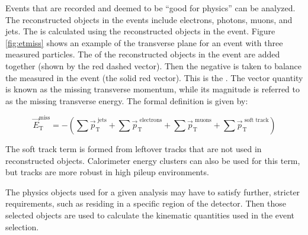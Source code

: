 Events that are recorded and deemed to be ``good for physics'' can be analyzed. The reconstructed objects in the events include electrons, photons, muons, and jets. The \etmiss is calculated using the reconstructed objects in the event. Figure \ref{fig:etmiss} shows an example of the transverse plane for an event with three measured particles. The \pt of the reconstructed objects in the event are added together (shown by the red dashed vector). Then the negative is taken to balance the measured \pt in the event (the solid red vector). This is the \etmissvec. The vector quantity \etmissvec is known as the missing transverse momentum, while its magnitude \etmiss is referred to as the missing transverse energy. The formal definition is given by:

\begin{equation}
\vec{E}_\text{T}^\text{miss} = - \left( \sum \vec{p}_\text{T}^\text{ jets} + \sum \vec{p}_\text{T}^\text{ electrons} + \sum \vec{p}_\text{T}^\text{ muons} + \sum \vec{p}_\text{T}^\text{ soft track} \right)
\end{equation}

\noindent The soft track term is formed from leftover tracks that are not used in reconstructed objects. Calorimeter energy clusters can also be used for this term, but tracks are more robust in high pileup environments. 

The physics objects used for a given analysis may have to satisfy further, stricter requirements, such as residing in a specific region of the detector. Then those selected objects are used to calculate the kinematic quantities used in the event selection.

\clearpage

